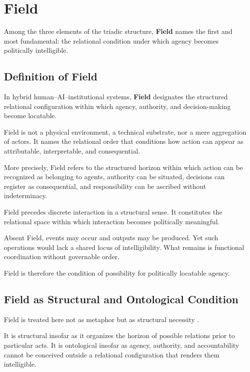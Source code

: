 \documentclass[12pt]{article}
\begin{document}
\section{Field}


Among the three elements of the triadic structure, \textbf{Field} names the first and most fundamental: the relational condition under which agency becomes politically intelligible.

\subsection{Definition of Field}


In hybrid human–AI–institutional systems, \textbf{Field} designates the structured relational configuration within which agency, authority, and decision-making become locatable.

Field is not a physical environment, a technical substrate, nor a mere aggregation of actors. It names the relational order that conditions how action can appear as attributable, interpretable, and consequential.

More precisely, Field refers to the structured horizon within which action can be recognized as belonging to agents, authority can be situated, decisions can register as consequential, and responsibility can be ascribed without indeterminacy.

Field precedes discrete interaction in a structural sense. It constitutes the relational space within which interaction becomes politically meaningful.

Absent Field, events may occur and outputs may be produced. Yet such operations would lack a shared locus of intelligibility. What remains is functional coordination without governable order.

Field is therefore the condition of possibility for politically locatable agency.

\subsection{Field as Structural and Ontological Condition}


Field is treated here not as metaphor but as structural necessity \citep{Winner1986}.

It is structural insofar as it organizes the horizon of possible relations prior to particular acts. It is ontological insofar as agency, authority, and accountability cannot be conceived outside a relational configuration that renders them intelligible.
\end{document}
